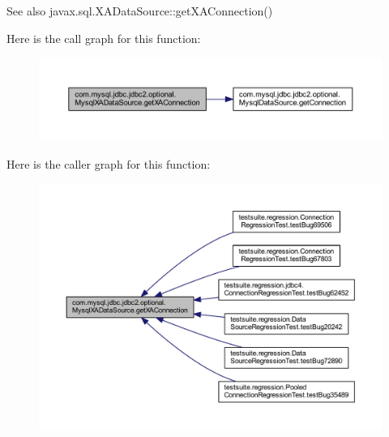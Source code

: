 \begin{DoxySeeAlso}{See also}
javax.\+sql.\+X\+A\+Data\+Source\+::get\+X\+A\+Connection() 
\end{DoxySeeAlso}
Here is the call graph for this function\+:
\nopagebreak
\begin{figure}[H]
\begin{center}
\leavevmode
\includegraphics[width=350pt]{classcom_1_1mysql_1_1jdbc_1_1jdbc2_1_1optional_1_1_mysql_x_a_data_source_a767e7d22d5ab6144aac907e6f0a1114b_cgraph}
\end{center}
\end{figure}
Here is the caller graph for this function\+:
\nopagebreak
\begin{figure}[H]
\begin{center}
\leavevmode
\includegraphics[width=350pt]{classcom_1_1mysql_1_1jdbc_1_1jdbc2_1_1optional_1_1_mysql_x_a_data_source_a767e7d22d5ab6144aac907e6f0a1114b_icgraph}
\end{center}
\end{figure}
\mbox{\label{classcom_1_1mysql_1_1jdbc_1_1jdbc2_1_1optional_1_1_mysql_x_a_data_source_a761134f83e2cba1ce06abd3185720691}} 
